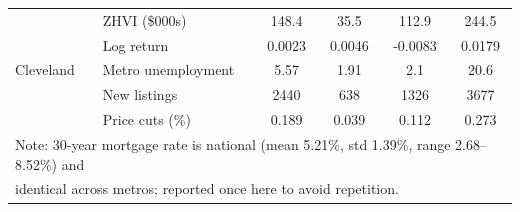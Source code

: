 \begin{table}[h]
\begin{tabular}{llcccc}
\hline
\multirow{5}{*}{Cleveland}
  & ZHVI (\$000s)        & 148.4  & 35.5  & 112.9  & 244.5  \\
  & Log return           & 0.0023 & 0.0046 & -0.0083 & 0.0179 \\
  & Metro unemployment   & 5.57  & 1.91  & 2.1    & 20.6   \\
  & New listings         & 2440  & 638   & 1326   & 3677   \\
  & Price cuts (\%)      & 0.189 & 0.039 & 0.112  & 0.273  \\
\hline
\multicolumn{6}{l}{\footnotesize Note: 30-year mortgage rate is national 
(mean 5.21\%, std 1.39\%, range 2.68--8.52\%) and} \\
\multicolumn{6}{l}{\footnotesize identical across metros; reported once 
here to avoid repetition.} \\
\end{tabular}
\end{table}
